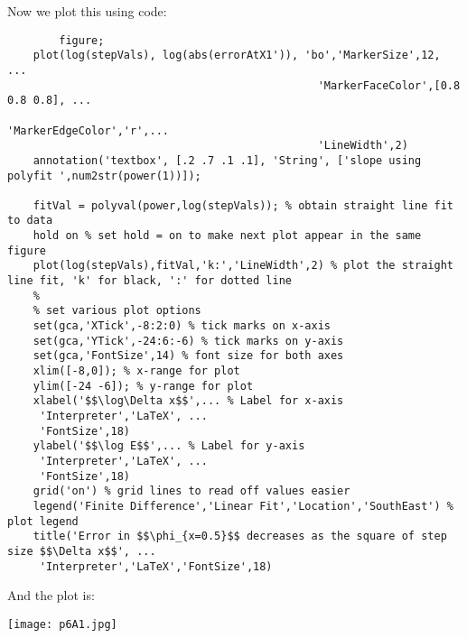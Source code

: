 \documentclass{article}
\begin{document}
    Now we plot this using code:\\
    \begin{lstlisting}
        figure;
    plot(log(stepVals), log(abs(errorAtX1')), 'bo','MarkerSize',12, ...
                                                'MarkerFaceColor',[0.8 0.8 0.8], ...
                                                'MarkerEdgeColor','r',...
                                                'LineWidth',2)
    annotation('textbox', [.2 .7 .1 .1], 'String', ['slope using polyfit ',num2str(power(1))]);

    fitVal = polyval(power,log(stepVals)); % obtain straight line fit to data
    hold on % set hold = on to make next plot appear in the same figure
    plot(log(stepVals),fitVal,'k:','LineWidth',2) % plot the straight line fit, 'k' for black, ':' for dotted line
    %
    % set various plot options
    set(gca,'XTick',-8:2:0) % tick marks on x-axis
    set(gca,'YTick',-24:6:-6) % tick marks on y-axis
    set(gca,'FontSize',14) % font size for both axes
    xlim([-8,0]); % x-range for plot
    ylim([-24 -6]); % y-range for plot
    xlabel('$$\log\Delta x$$',... % Label for x-axis
     'Interpreter','LaTeX', ...
     'FontSize',18)
    ylabel('$$\log E$$',... % Label for y-axis
     'Interpreter','LaTeX', ...
     'FontSize',18)
    grid('on') % grid lines to read off values easier
    legend('Finite Difference','Linear Fit','Location','SouthEast') % plot legend
    title('Error in $$\phi_{x=0.5}$$ decreases as the square of step size $$\Delta x$$', ...
     'Interpreter','LaTeX','FontSize',18)
    \end{lstlisting}

    And the plot is:\\
    \centerline{\texttt{[image: p6A1.jpg]}}
\end{document}
